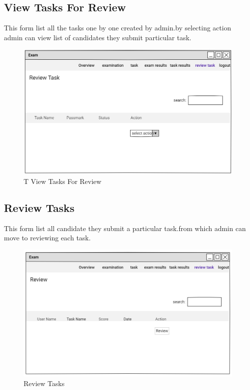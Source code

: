 \documentclass[a4paper,12pt]{report}
\begin{document}
\subsection { View Tasks For  Review}
This form list all the tasks one by one created by admin.by selecting action admin can view list of candidates they submit particular task.
\begin{figure}[bph]
	\centering
	\includegraphics[width=.9\linewidth]{img/admin/rvwtask1}
	\caption{T View Tasks For  Review}
\end{figure}
\pagebreak

\subsection { Review  Tasks}
This form list all candidate they submit a particular task.from which admin can move to reviewing each task.
\begin{figure}[bph]
	\centering
	\includegraphics[width=.6\linewidth]{img/admin/rvwtsk2}
	\caption{Review  Tasks}
\end{figure}
\end{document}
